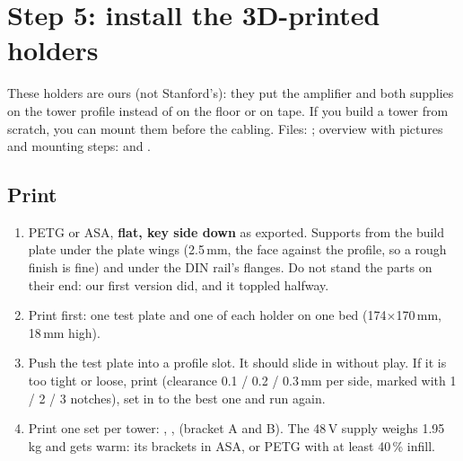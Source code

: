 \section{Step 5: install the 3D-printed holders}\label{sec:walk-printed}
These holders are ours (not Stanford's): they put the amplifier and both supplies on the tower profile
instead of on the floor or on tape. If you build a tower from scratch, you can mount them before the
cabling. Files: ; overview with pictures and mounting steps:
 and .

\subsection{Print}
\begin{enumerate}
\item PETG or ASA, \textbf{flat, key side down} as exported. Supports from the build plate under the plate wings (2.5\,mm, the face against the profile, so a rough finish is fine) and under the DIN rail's flanges. Do not stand the parts on their end: our first version did, and it toppled halfway.
\item Print  first: one test plate and one of each holder on one bed (174$\times$170\,mm, 18\,mm high).
\item Push the test plate into a profile slot. It should slide in without play. If it is too tight or loose,
print  (clearance 0.1 / 0.2 / 0.3\,mm per side, marked with 1 / 2 / 3 notches), set
 in  to the best one and run  again.
\item Print one set per tower: , ,
 (bracket A and B). The 48\,V supply weighs 1.95\,kg and gets warm: its brackets in
ASA, or PETG with at least 40\,\% infill.
\end{enumerate}

